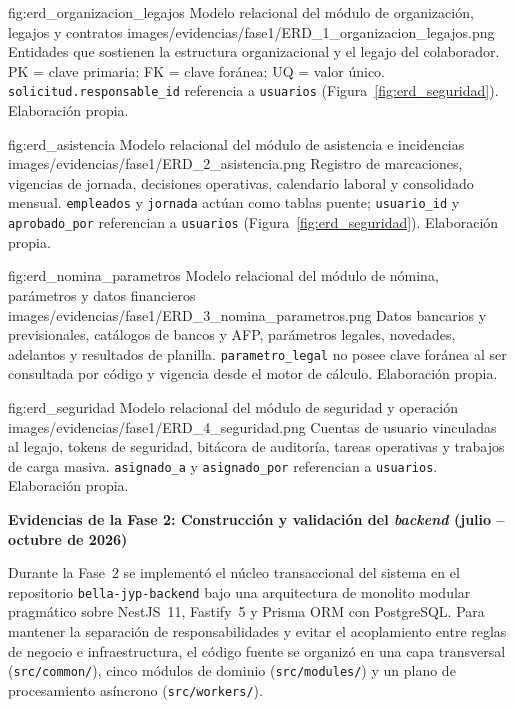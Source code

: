 \figuraEnTexto
    {fig:erd_organizacion_legajos}
    {Modelo relacional del módulo de organización, legajos y contratos}
    {images/evidencias/fase1/ERD_1_organizacion_legajos.png}
    {Entidades que sostienen la estructura organizacional y el legajo del colaborador. PK = clave primaria; FK = clave foránea; UQ = valor único. 
    \texttt{solicitud.responsable\_id} referencia a \texttt{usuarios} (Figura~\ref{fig:erd_seguridad}). Elaboración propia.}

\figuraEnTexto
    {fig:erd_asistencia}
    {Modelo relacional del módulo de asistencia e incidencias}
    {images/evidencias/fase1/ERD_2_asistencia.png}
    {Registro de marcaciones, vigencias de jornada, decisiones operativas, calendario laboral y consolidado mensual. 
    \texttt{empleados} y \texttt{jornada} actúan como tablas puente; \texttt{usuario\_id} y \texttt{aprobado\_por} referencian a \texttt{usuarios} (Figura~\ref{fig:erd_seguridad}). Elaboración propia.}

\figuraEnTexto
    {fig:erd_nomina_parametros}
    {Modelo relacional del módulo de nómina, parámetros y datos financieros}
    {images/evidencias/fase1/ERD_3_nomina_parametros.png}
    {Datos bancarios y previsionales, catálogos de bancos y AFP, parámetros legales, novedades, adelantos y resultados de planilla. 
    \texttt{parametro\_legal} no posee clave foránea al ser consultada por código y vigencia desde el motor de cálculo. Elaboración propia.}

\figuraEnTexto
    {fig:erd_seguridad}
    {Modelo relacional del módulo de seguridad y operación}
    {images/evidencias/fase1/ERD_4_seguridad.png}
    {Cuentas de usuario vinculadas al legajo, tokens de seguridad, bitácora de auditoría, tareas operativas y trabajos de carga masiva. 
    \texttt{asignado\_a} y \texttt{asignado\_por} referencian a \texttt{usuarios}. Elaboración propia.}

\par\medskip
\noindent\textbf{Evidencias de la Fase 2: Construcción y validación del \textit{backend} (julio – octubre de 2026)}\par
\nobreak
Durante la Fase~2 se implementó el núcleo transaccional del sistema en el repositorio 
\texttt{bella-jyp-backend} bajo una arquitectura de monolito modular pragmático sobre NestJS~11, 
Fastify~5 y Prisma ORM con PostgreSQL. 
Para mantener la separación de responsabilidades y evitar el acoplamiento entre reglas de negocio e infraestructura, 
el código fuente se organizó en una capa transversal (\texttt{src/common/}), 
cinco módulos de dominio (\texttt{src/modules/}) y un plano de procesamiento asíncrono (\texttt{src/workers/}).

